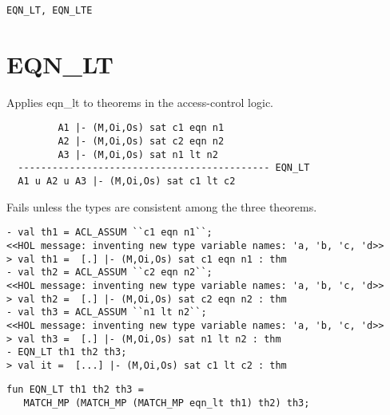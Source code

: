 \SEEALSO
\texttt{EQN\_LT, EQN\_LTE}
\ENDDOC

\section{EQN\_LT}




\egroup

\SYNOPSIS
Applies eqn\_lt to theorems in the access-control logic.

\DESCRIBE
\begin{verbatim}
         A1 |- (M,Oi,Os) sat c1 eqn n1
         A2 |- (M,Oi,Os) sat c2 eqn n2  
         A3 |- (M,Oi,Os) sat n1 lt n2
  -------------------------------------------- EQN_LT
  A1 u A2 u A3 |- (M,Oi,Os) sat c1 lt c2
\end{verbatim}

\FAILURE Fails unless the types are consistent among the three
theorems.

\EXAMPLE
\begin{holboxed}
\begin{verbatim}
- val th1 = ACL_ASSUM ``c1 eqn n1``;
<<HOL message: inventing new type variable names: 'a, 'b, 'c, 'd>>
> val th1 =  [.] |- (M,Oi,Os) sat c1 eqn n1 : thm
- val th2 = ACL_ASSUM ``c2 eqn n2``;
<<HOL message: inventing new type variable names: 'a, 'b, 'c, 'd>>
> val th2 =  [.] |- (M,Oi,Os) sat c2 eqn n2 : thm
- val th3 = ACL_ASSUM ``n1 lt n2``;
<<HOL message: inventing new type variable names: 'a, 'b, 'c, 'd>>
> val th3 =  [.] |- (M,Oi,Os) sat n1 lt n2 : thm
- EQN_LT th1 th2 th3;
> val it =  [...] |- (M,Oi,Os) sat c1 lt c2 : thm
\end{verbatim}
\end{holboxed}

\IMPLEMENTATION
\begin{holboxed}
\begin{verbatim}
fun EQN_LT th1 th2 th3 =
   MATCH_MP (MATCH_MP (MATCH_MP eqn_lt th1) th2) th3;
\end{verbatim}
\end{holboxed}

